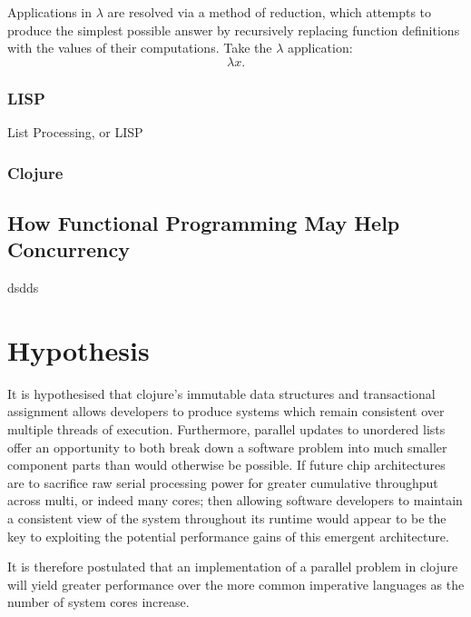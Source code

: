 \documentclass[12pt,a4paper]{article}
\begin{document}
Applications in $\lambda$ are resolved via a method of reduction, which attempts to produce the simplest possible answer by recursively replacing function definitions with the values of their computations. Take the $\lambda$ application:
\begin{displaymath}
    \lambda x.
\end{displaymath}





\subsubsection{LISP}


List Processing, or LISP  \cite{historyOfLisp}





\subsubsection{Clojure}
\subsection{How Functional Programming May Help Concurrency}


\cite{promisesOfFunctionalProgramming}
\cite{theFreeLunchIsOver}
\cite{concurrencyChallenges}
dsdds

\newpage
\section{Hypothesis}

It is hypothesised that clojure's immutable data structures and transactional assignment allows developers to produce systems which remain consistent over multiple threads of execution. Furthermore, parallel updates to unordered lists offer an opportunity to both   break down a software problem into much smaller component parts than would otherwise be possible. If future chip architectures are to sacrifice raw serial processing power for greater cumulative throughput across multi, or indeed many cores; then allowing software developers to maintain a consistent view of the system throughout its runtime would appear to be the key to exploiting the potential performance gains of this emergent architecture.

It is therefore postulated that an implementation of a parallel problem in clojure will yield greater performance over the more common imperative languages as the number of system cores increase.
\end{document}
